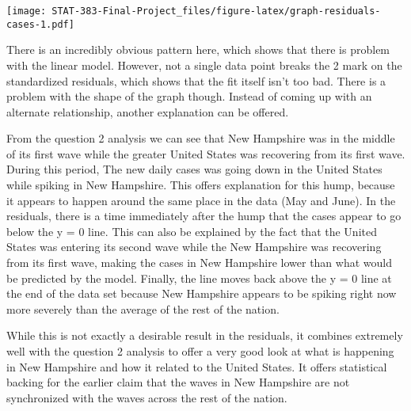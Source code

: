 \documentclass[
]{article}
\newenvironment{Shaded}{\begin{snugshade}}{\end{snugshade}}
\newcommand{\DataTypeTok}[1]{\textcolor[rgb]{0.13,0.29,0.53}{#1}}
\newcommand{\DecValTok}[1]{\textcolor[rgb]{0.00,0.00,0.81}{#1}}
\newcommand{\KeywordTok}[1]{\textcolor[rgb]{0.13,0.29,0.53}{\textbf{#1}}}
\newcommand{\NormalTok}[1]{#1}
\newcommand{\OperatorTok}[1]{\textcolor[rgb]{0.81,0.36,0.00}{\textbf{#1}}}
\newcommand{\StringTok}[1]{\textcolor[rgb]{0.31,0.60,0.02}{#1}}
\begin{document}
\begin{Shaded}
\end{Shaded}

\texttt{[image: STAT-383-Final-Project\_files/figure-latex/graph-residuals-cases-1.pdf]}

There is an incredibly obvious pattern here, which shows that there is
problem with the linear model. However, not a single data point breaks
the 2 mark on the standardized residuals, which shows that the fit
itself isn't too bad. There is a problem with the shape of the graph
though. Instead of coming up with an alternate relationship, another
explanation can be offered.

From the question 2 analysis we can see that New Hampshire was in the
middle of its first wave while the greater United States was recovering
from its first wave. During this period, The new daily cases was going
down in the United States while spiking in New Hampshire. This offers
explanation for this hump, because it appears to happen around the same
place in the data (May and June). In the residuals, there is a time
immediately after the hump that the cases appear to go below the y = 0
line. This can also be explained by the fact that the United States was
entering its second wave while the New Hampshire was recovering from its
first wave, making the cases in New Hampshire lower than what would be
predicted by the model. Finally, the line moves back above the y = 0
line at the end of the data set because New Hampshire appears to be
spiking right now more severely than the average of the rest of the
nation.

While this is not exactly a desirable result in the residuals, it
combines extremely well with the question 2 analysis to offer a very
good look at what is happening in New Hampshire and how it related to
the United States. It offers statistical backing for the earlier claim
that the waves in New Hampshire are not synchronized with the waves
across the rest of the nation.
\end{document}
